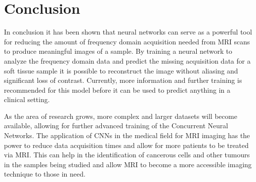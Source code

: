 \documentclass[14pt]{extreport}
\begin{document}
    \section*{Conclusion}
        In conclusion it has been shown that neural networks can serve as a powerful tool for reducing the amount of frequency domain acquisition needed from MRI scans to produce meaningful images of a sample. By training a neural network to analyze the frequency domain data and predict the missing acquisition data for a soft tissue sample it is possible to reconstruct the image without aliasing and significant loss of contrast. Currently, more information and further training is recommended for this model before it can be used to predict anything in a clinical setting. 

        As the area of research grows, more complex and larger datasets will become available, allowing for further advanced training of the Concurrent Neural Networks. The application of CNNs in the medical field for MRI imaging has the power to reduce data acquisition times and allow for more patients to be treated via MRI. This can help in the identification of cancerous cells and other tumours in the samples being studied and allow MRI to become a more accessible imaging technique to those in need.




    
    
\end{document}
